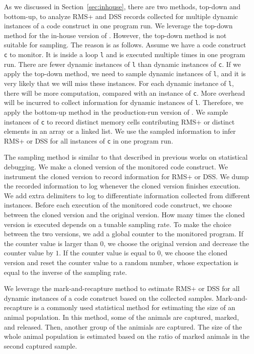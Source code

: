 As we discussed in Section~\ref{sec:inhouse}, 
there are two methods, top-down and bottom-up, 
to analyze RMS+ and DSS records collected 
for multiple dynamic instances of a code construct in one program run. 
We leverage the top-down method for the in-house version of \Tool. 
However, the top-down method is not suitable for sampling. 
The reason is as follows.
Assume we have a code construct \texttt{c} to monitor. 
It is inside a loop \texttt{l} and is executed multiple times in one program run.
There are fewer dynamic instances of \texttt{l}
than dynamic instances of \texttt{c}.
If we apply the top-down method, 
we need to sample dynamic instances of \texttt{l}, 
and it is very likely that we will miss these instances. 
For each dynamic instance of \texttt{l}, 
there will be more computation, 
compared with an instance of \texttt{c}.
More overhead will be incurred to collect 
information for dynamic instances of \texttt{l}.
Therefore, we apply the bottom-up method 
in the production-run version of \Tool.
We sample instances of \texttt{c} to record 
distinct memory cells contributing RMS+ 
or distinct elements in an array or a linked list.
We use the sampled information to infer RMS+ 
or DSS for all instances of \texttt{c} in one program run.


The sampling method is similar to that described in previous works on statistical 
debugging\cite{liblit03,liblit05,CCI,SongOOPSLA2014,ldoctor}.
We make a cloned version of the monitored code construct.
We instrument the cloned version to record information for RMS+ or DSS. 
We dump the recorded information to log 
whenever the cloned version finishes execution. 
We add extra delimiters to log to differentiate information collected from different instances.
Before each execution of the monitored code construct, 
we choose between the cloned version and the original version. 
How many times the cloned version is executed 
depends on a tunable sampling rate. 
To make the choice between the two versions,
we add a global counter to the monitored program. 
If the counter value is larger than $0$, 
we choose the original version and decrease the counter value by $1$.
If the counter value is equal to $0$,
we choose the cloned version and reset the counter value to 
a random number, 
whose expectation is equal to the inverse of the sampling rate.  


We leverage the mark-and-recapture method\citep{mark-recapture} to 
estimate RMS+ or DSS for all dynamic instances of a code construct 
based on the collected samples. 
Mark-and-recapture is a commonly used statistical method 
for estimating the size of an animal population. 
In this method, some of the animals are captured, marked, and released. 
Then, another group of the animials are captured.
The size of the whole animal population is estimated 
based on the ratio of marked animals in the second captured sample.  


